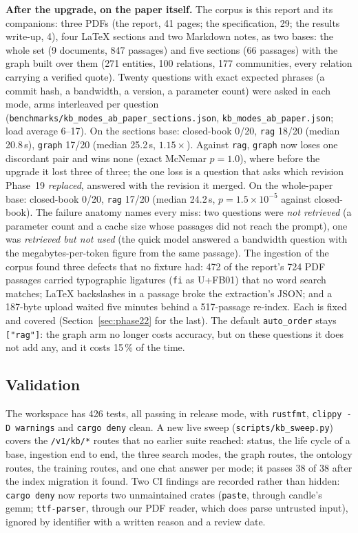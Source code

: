 \textbf{After the upgrade, on the paper itself.} The corpus is this report and its companions: three PDFs (the report, 41 pages; the specification, 29;
the results write-up, 4), four \LaTeX{} sections and two Markdown notes, as two bases: the whole set (9 documents, 847 passages) and five sections
(66 passages) with the graph built over them (271 entities, 100 relations, 177 communities, every relation carrying a verified quote). Twenty questions
with exact expected phrases (a commit hash, a bandwidth, a version, a parameter count) were asked in each mode, arms interleaved per question
(\texttt{benchmarks/kb\_modes\_ab\_paper\_sections.json}, \texttt{kb\_modes\_ab\_paper.json}; load average 6--17). On the sections base:
closed-book 0/20, \texttt{rag} 18/20 (median 20.8\,s), \texttt{graph} 17/20 (median 25.2\,s, $1.15\times$). Against \texttt{rag}, \texttt{graph}
now loses one discordant pair and wins none (exact McNemar $p=1.0$), where before the upgrade it lost three of three; the one loss is a question that
asks which revision Phase~19 \emph{replaced}, answered with the revision it merged. On the whole-paper base: closed-book 0/20, \texttt{rag} 17/20
(median 24.2\,s, $p=1.5{\times}10^{-5}$ against closed-book). The failure anatomy names every miss: two questions were \emph{not retrieved} (a parameter
count and a cache size whose passages did not reach the prompt), one was \emph{retrieved but not used} (the quick model
answered a bandwidth question with the megabytes-per-token figure from the same passage). The ingestion of the corpus found three defects that no
fixture had: 472 of the report's 724 PDF passages carried typographic ligatures (\texttt{fi} as U+FB01) that no word search matches; \LaTeX{}
backslashes in a passage broke the extraction's JSON; and a 187-byte upload waited five minutes behind a 517-passage re-index. Each is fixed and
covered (Section~\ref{sec:phase22} for the last). The default \texttt{auto\_order} stays \texttt{["rag"]}: the graph arm no longer costs accuracy, but
on these questions it does not add any, and it costs 15\,\% of the time.

\subsection{Validation}

The workspace has 426 tests, all passing in release mode, with \texttt{rustfmt}, \texttt{clippy -D warnings} and \texttt{cargo deny} clean. A new live sweep
(\texttt{scripts/kb\_sweep.py}) covers the \texttt{/v1/kb/*} routes that no earlier suite reached: status, the life cycle of a base, ingestion end to end, the
three search modes, the graph routes, the ontology routes, the training routes, and one chat answer per mode; it passes 38 of 38 after the index migration
it found. Two CI findings are recorded rather than hidden: \texttt{cargo deny} now reports two unmaintained crates (\texttt{paste}, through candle's gemm;
\texttt{ttf-parser}, through our PDF reader, which does parse untrusted input), ignored by identifier with a written reason and a review date.
